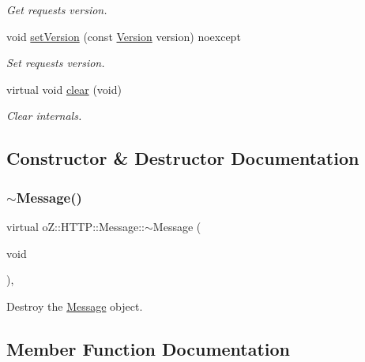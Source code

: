 \begin{DoxyCompactItemize}
\begin{DoxyCompactList}\small\item\em Get request\textquotesingle{}s version. \end{DoxyCompactList}\item 
void \mbox{\hyperlink{classo_z_1_1_h_t_t_p_1_1_message_ac3fa35df570a24f54999e1091fac0726}{set\+Version}} (const \mbox{\hyperlink{structo_z_1_1_h_t_t_p_1_1_version}{Version}} version) noexcept
\begin{DoxyCompactList}\small\item\em Set request\textquotesingle{}s version. \end{DoxyCompactList}\item 
virtual void \mbox{\hyperlink{classo_z_1_1_h_t_t_p_1_1_message_a6521457d95eeca4fbffaf5bc55e5d16d}{clear}} (void)
\begin{DoxyCompactList}\small\item\em Clear internals. \end{DoxyCompactList}\end{DoxyCompactItemize}


\subsection{Constructor \& Destructor Documentation}
\mbox{\label{classo_z_1_1_h_t_t_p_1_1_message_a42e40b68d8080d66ca335a2b8fc45c79}} 
\subsubsection{\texorpdfstring{$\sim$Message()}{~Message()}}
{\footnotesize\ttfamily virtual o\+Z\+::\+H\+T\+T\+P\+::\+Message\+::$\sim$\+Message (\begin{DoxyParamCaption}\item[{void}]{ }\end{DoxyParamCaption})\hspace{0.3cm}{\ttfamily [virtual]}, {\ttfamily [default]}}



Destroy the \mbox{\hyperlink{classo_z_1_1_h_t_t_p_1_1_message}{Message}} object. 



\subsection{Member Function Documentation}
\mbox{\label{classo_z_1_1_h_t_t_p_1_1_message_a6521457d95eeca4fbffaf5bc55e5d16d}} 
